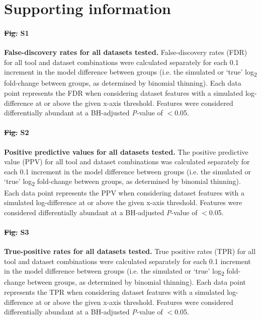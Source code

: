 \documentclass[10pt,letterpaper]{article}
\providecommand{\DIFaddtex}[1]{{\protect\color{blue}\uwave{#1}}} %
\providecommand{\DIFdeltex}[1]{{\protect\color{red}\sout{#1}}}                      %
\providecommand{\DIFaddbegin}{} %
\providecommand{\DIFaddend}{} %
\providecommand{\DIFdelbegin}{} %
\providecommand{\DIFdelend}{} %
\providecommand{\DIFadd}[1]{\texorpdfstring{\DIFaddtex{#1}}{#1}} %
\providecommand{\DIFdel}[1]{\texorpdfstring{\DIFdeltex{#1}}{}} %
\newcommand{\DIFscaledelfig}{0.5}
\newlength{\DIFdelgraphicswidth} %
\newlength{\DIFdelgraphicsheight} %
\newcommand{\DIFaddincludegraphics}[2][]{{\color{blue}\fbox{\DIFOincludegraphics[#1]{#2}}}} %
\newcommand{\DIFdelincludegraphics}[2][]{%
\sbox{\DIFdelgraphicsbox}{\DIFOincludegraphics[#1]{#2}}%
\settoboxwidth{\DIFdelgraphicswidth}{\DIFdelgraphicsbox} %
\settoboxtotalheight{\DIFdelgraphicsheight}{\DIFdelgraphicsbox} %
\scalebox{\DIFscaledelfig}{%
\parbox[b]{\DIFdelgraphicswidth}{\usebox{\DIFdelgraphicsbox}\\[-\baselineskip] \rule{\DIFdelgraphicswidth}{0em}}\llap{\resizebox{\DIFdelgraphicswidth}{\DIFdelgraphicsheight}{%
\setlength{\unitlength}{\DIFdelgraphicswidth}%
\begin{picture}(1,1)%
\thicklines\linethickness{2pt} %
{\color[rgb]{1,0,0}\put(0,0){\framebox(1,1){}}}%
{\color[rgb]{1,0,0}\put(0,0){\line( 1,1){1}}}%
{\color[rgb]{1,0,0}\put(0,1){\line(1,-1){1}}}%
\end{picture}%
}\hspace*{3pt}}} %
} %
\DeclareRobustCommand{\DIFaddbegin}{\DIFOaddbegin \let\includegraphics\DIFaddincludegraphics} %
\DeclareRobustCommand{\DIFaddend}{\DIFOaddend \let\includegraphics\DIFOincludegraphics} %
\DeclareRobustCommand{\DIFdelbegin}{\DIFOdelbegin \let\includegraphics\DIFdelincludegraphics} %
\DeclareRobustCommand{\DIFdelend}{\DIFOaddend \let\includegraphics\DIFOincludegraphics} %
\begin{document}

\section*{Supporting information}

\paragraph*{\DIFdelbegin \DIFdel{Fig. }\DIFdelend S1 \DIFaddbegin \DIFadd{Fig}\DIFaddend }
\label{fig:supFigFDR_all}
\textbf{False-discovery rates for all datasets tested.} False-discovery rates (FDR) for all tool and dataset combinations were calculated separately for each 0.1 increment in the model difference between groups (i.e. the simulated or `true' log\textsubscript{2} fold-change between groups, as determined by binomial thinning). Each data point represents the FDR when considering dataset features with a simulated log-difference at or above the given x-axis threshold. Features were considered differentially abundant at a BH-adjusted \textit{P}-value of $<$0.05.

\paragraph*{\DIFdelbegin \DIFdel{Fig. }\DIFdelend S2 \DIFaddbegin \DIFadd{Fig}\DIFaddend }
\label{fig:supFigPPV_all}
\textbf{Positive predictive values for all datasets tested.} The positive predictive value (PPV) for all tool and dataset combinations was calculated separately for each 0.1 increment in the model difference between groups (i.e. the simulated or `true' log\textsubscript{2} fold-change between groups, as determined by binomial thinning). Each data point represents the PPV when considering dataset features with a simulated log-difference at or above the given x-axis threshold. Features were considered differentially abundant at a BH-adjusted \textit{P}-value of $<$0.05.

\paragraph*{\DIFdelbegin \DIFdel{Fig. }\DIFdelend S3 \DIFaddbegin \DIFadd{Fig}\DIFaddend }
\label{fig:supFigTPR_all}
\textbf{True-positive rates for all datasets tested.} True positive rates (TPR) for all tool and dataset combinations were calculated separately for each 0.1 increment in the model difference between groups (i.e. the simulated or `true' log\textsubscript{2} fold-change between groups, as determined by binomial thinning). Each data point represents the TPR when considering dataset features with a simulated log-difference at or above the given x-axis threshold. Features were considered differentially abundant at a BH-adjusted \textit{P}-value of $<$0.05.
\end{document}
